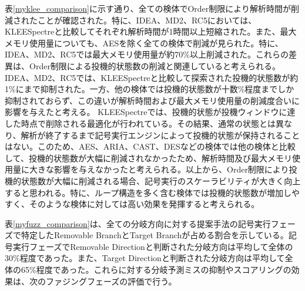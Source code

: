表\ref{myklee_comparison}に示す通り、全ての検体でOrder制限により解析時間が削減されたことが確認された。特に、IDEA、MD2、RC5においては、KLEESpectreと比較してそれぞれ解析時間が1時間以上短縮された。また、最大メモリ使用量についても、AESを除く全ての検体で削減が見られた。特に、IDEA、MD2、RC5では最大メモリ使用量が約70\%以上削減された。これらの差異は、Order制限による投機的状態数の削減と関連していると考えられる。IDEA、MD2、RC5では、KLEESpectreと比較して探索された投機的状態数が約1\%にまで抑制された。一方、他の検体では投機的状態数が十数\%程度までしか抑制されておらず、この違いが解析時間および最大メモリ使用量の削減度合いに影響を与えたと考える。
KLEESpectreでは、投機的状態が投機ウィンドウに達した時点で削除される最適化が行われている。その結果、通常の状態とは異なり、解析が終了するまで記号実行エンジンによって投機的状態が保持されることはない。このため、AES、ARIA、CAST、DESなどの検体では他の検体と比較して、投機的状態数が大幅に削減されなかったため、解析時間及び最大メモリ使用量に大きな影響を与えなかったと考えられる。以上から、Order制限により投機的状態数が大幅に削減される場合、記号実行のスケーラビリティが大きく向上すると思われる。特に、ループ構造を多く含む検体では投機的状態数が増加しやすく、そのような検体に対しては高い効果を発揮すると考えられる。\par

表\ref{myfuzz_comparison}は、全ての分岐方向に対する提案手法の記号実行フェーズで特定したRemovable BranchとTarget Branchが占める割合を示している。記号実行フェーズでRemovable Directionと判断された分岐方向は平均して全体の30\%程度であった。また、Target Directionと判断された分岐方向は平均して全体の65\%程度であった。これらに対する分岐予測ミスの抑制やスコアリングの効果は、次のファジングフェーズの評価で行う。\par

